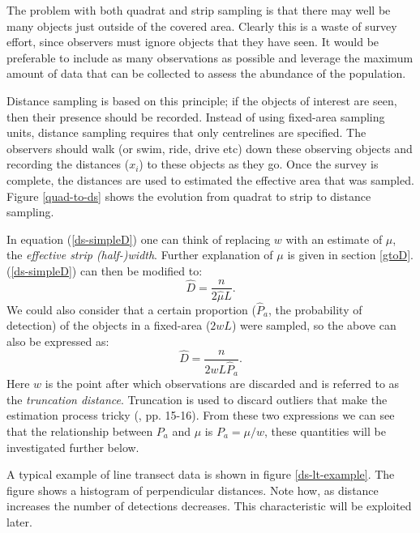 The problem with both quadrat and strip sampling is that there may well be many objects just outside of the covered area. Clearly this is a waste of survey effort, since observers must ignore objects that they have seen. It would be preferable to include as many observations as possible and leverage the maximum amount of data that can be collected to assess the abundance of the population.

Distance sampling is based on this principle; if the objects of interest are seen, then their presence should be recorded. Instead of using fixed-area sampling units, distance sampling requires that only centrelines are specified. The observers should walk (or swim, ride, drive etc) down these observing objects and recording the distances ($x_i$) to these objects as they go. Once the survey is complete, the distances are used to estimated the effective area that was sampled. Figure \ref{quad-to-ds} shows the evolution from quadrat to strip to distance sampling.

In equation (\ref{ds-simpleD}) one can think of replacing $w$ with an estimate of $\mu$, the \textit{effective strip (half-)width}. Further explanation of $\mu$ is given in section \ref{gtoD}. (\ref{ds-simpleD}) can then be modified to:
\begin{equation}
\hat{D}=\frac{n}{2\hat{\mu}L}.
\label{ds-D}
\end{equation}
We could also consider that a certain proportion ($\hat{P}_a$, the probability of detection) of the objects in a fixed-area ($2wL$) were sampled, so the above can also be expressed as:
\begin{equation*}
\hat{D}=\frac{n}{2wL\hat{P}_a}.
\end{equation*}
Here $w$ is the point after which observations are discarded and is referred to as the \textit{truncation distance}. Truncation is used to discard outliers that make the estimation process tricky (\cite{IDS}, pp. 15-16). From these two expressions we can see that the relationship between $P_a$ and $\mu$ is $P_a=\mu/w$, these quantities will be investigated further below.

A typical example of line transect data is shown in figure \ref{ds-lt-example}. The figure shows a histogram of perpendicular distances. Note how, as distance increases the number of detections decreases. This characteristic will be exploited later.

